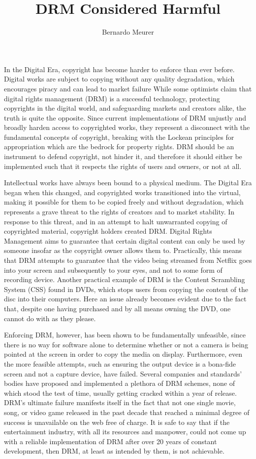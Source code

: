 \documentclass[12pt]{article}
\title{DRM Considered Harmful}
\author{Bernardo Meurer}
\begin{document}
\maketitle
\newpage
\onehalfspacing
In the Digital Era, copyright has become harder to enforce than ever before. Digital works are subject to copying without any quality degradation, which encourages piracy and can lead to market failure\cite[p.118]{favale} While some optimists\cite[p.236]{goldstein} claim that digital rights management (DRM) is a successful technology, protecting copyrights in the digital world, and safeguarding markets and creators alike, the truth is quite the opposite. Since current implementations of DRM unjustly and broadly harden access to copyrighted works, they represent a disconnect with the fundamental concepts of copyright, breaking with the Lockean principles for appropriation which are the bedrock for property rights. DRM should be an instrument to defend copyright, not hinder it, and therefore it should either be implemented such that it respects the rights of users and owners, or not at all.

Intellectual works have always been bound to a physical medium. The Digital Era began when this changed, and copyrighted works transitioned into the virtual, making it possible for them to be copied freely and without degradation, which represents a grave threat to the rights of creators and to market stability\cite[p.117]{favale}. In response to this threat, and in an attempt to halt unwarranted copying of copyrighted material, copyright holders created DRM. Digital Rights Management aims to guarantee that certain digital content can only be used by someone insofar as the copyright owner allows them to. Practically, this means that DRM attempts to guarantee that the video being streamed from Netflix goes into your screen and subsequently to your eyes, and not to some form of recording device. Another practical example of DRM is the Content Scrambling System (CSS) found in DVDs, which stops users from copying the content of the disc into their computers. Here an issue already becomes evident due to the fact that, despite one having purchased and by all means owning the DVD, one cannot do with as they please.

Enforcing DRM, however, has been shown to be fundamentally unfeasible, since there is no way for software alone to determine whether or not a camera is being pointed at the screen in order to copy the media on display. Furthermore, even the more feasible attempts, such as ensuring the output device is a bona-fide screen and not a capture device, have failed. Several companies and standards' bodies have proposed and implemented a plethora of DRM schemes, none of which stood the test of time, usually getting cracked within a year of release. DRM's ultimate failure manifests itself in the fact that not one single movie, song, or video game released in the past decade that reached a minimal degree of success is unavailable on the web free of charge. It is safe to say that if the entertainment industry, with all its resources and manpower, could not come up with a reliable implementation of DRM after over 20 years of constant development, then DRM, at least as intended by them, is not achievable.
\end{document}
